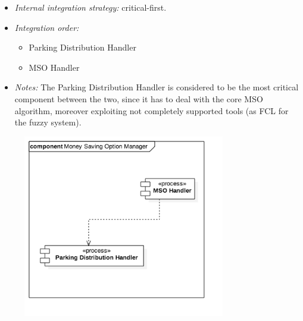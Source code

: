 			\begin{itemize}[label={},leftmargin=*,noitemsep,topsep=0pt]
				\item \textit{Internal integration strategy:} critical-first.
				\item \textit{Integration order:}
					\begin{itemize}[noitemsep]
						\item Parking Distribution Handler
						\item MSO Handler
					\end{itemize}
				\item \textit{Notes: } The Parking Distribution Handler is considered to be the most critical component between the two, since it has to deal with the core MSO algorithm, moreover exploiting not completely supported tools (as FCL for the fuzzy system).
			\end{itemize}
			\begin{figure}[h]
				\includegraphics[width=250pt, center]{img/integration_strategy/subcomponents/money_saving_option_manager.png}
			\end{figure}
		\FloatBarrier

